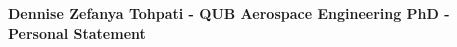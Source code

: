 
\begin{center}
\setlength{\parskip}{0.5em}
\textbf{Dennise Zefanya Tohpati - QUB Aerospace Engineering PhD - Personal Statement}
\end{center}

